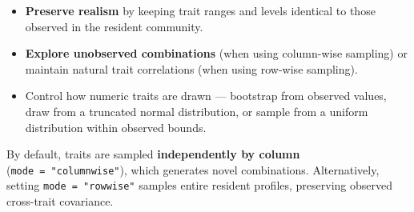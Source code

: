 \documentclass[
]{article}
\providecommand{\tightlist}{%
  \setlength{\itemsep}{0pt}\setlength{\parskip}{0pt}}
\begin{document}
\begin{itemize}
\tightlist
\item
  \textbf{Preserve realism} by keeping trait ranges and levels identical
  to those observed in the resident community.
\item
  \textbf{Explore unobserved combinations} (when using column-wise
  sampling) or maintain natural trait correlations (when using row-wise
  sampling).
\item
  Control how numeric traits are drawn --- bootstrap from observed
  values, draw from a truncated normal distribution, or sample from a
  uniform distribution within observed bounds.
\end{itemize}

By default, traits are sampled \textbf{independently by column}
(\texttt{mode\ =\ "columnwise"}), which generates novel combinations.
Alternatively, setting \texttt{mode\ =\ "rowwise"} samples entire
resident profiles, preserving observed cross-trait covariance.
\end{document}
